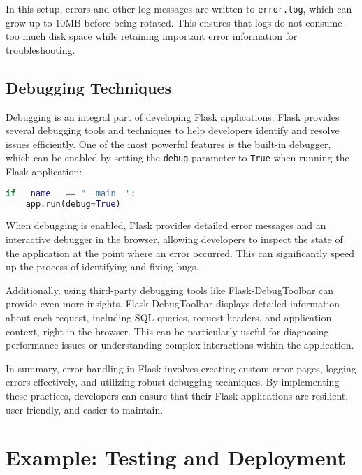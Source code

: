 In this setup, errors and other log messages are written to \texttt{error.log}, which can grow up to 10MB before being rotated. This ensures that logs do not consume too much disk space while retaining important error information for troubleshooting.

\subsection{Debugging Techniques}

Debugging is an integral part of developing Flask applications. Flask provides several debugging tools and techniques to help developers identify and resolve issues efficiently. One of the most powerful features is the built-in debugger, which can be enabled by setting the \texttt{debug} parameter to \texttt{True} when running the Flask application:

\begin{lstlisting}[language=Python]
	if __name__ == "__main__":
	app.run(debug=True)
\end{lstlisting}

When debugging is enabled, Flask provides detailed error messages and an interactive debugger in the browser, allowing developers to inspect the state of the application at the point where an error occurred. This can significantly speed up the process of identifying and fixing bugs.

Additionally, using third-party debugging tools like Flask-DebugToolbar can provide even more insights. Flask-DebugToolbar displays detailed information about each request, including SQL queries, request headers, and application context, right in the browser. This can be particularly useful for diagnosing performance issues or understanding complex interactions within the application.

In summary, error handling in Flask involves creating custom error pages, logging errors effectively, and utilizing robust debugging techniques. By implementing these practices, developers can ensure that their Flask applications are resilient, user-friendly, and easier to maintain.\cite{Grinberg:2018}

\section{Example: Testing and Deployment }

